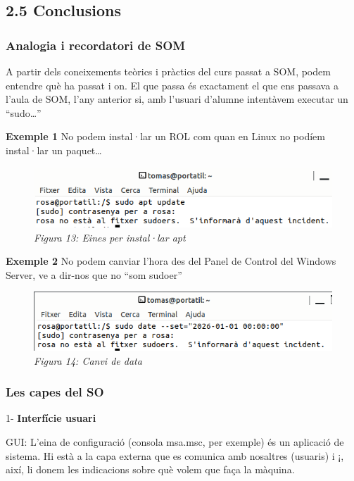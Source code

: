 \documentclass[
  a4paper,
]{article}
\begin{document}
\subsection{2.5 Conclusions}\label{conclusions}

\subsubsection{Analogia i recordatori de
SOM}\label{analogia-i-recordatori-de-som}

A partir dels coneixements teòrics i pràctics del curs passat a SOM,
podem entendre què ha passat i on. El que passa és exactament el que ens
passava a l'aula de SOM, l'any anterior si, amb l'usuari d'alumne
intentàvem executar un ``sudo\ldots{}''

\textbf{Exemple 1} No podem instal·lar un ROL com quan en Linux no
podíem instal·lar un paquet\ldots{}

\begin{figure}
\centering
\includegraphics{png/rosaUpdate.png}
\caption{\emph{Figura 13: Eines per instal·lar apt}}
\end{figure}

\textbf{Exemple 2} No podem canviar l'hora des del Panel de Control del
Windows Server, ve a dir-nos que no ``som sudoer''

\begin{figure}
\centering
\includegraphics{png/rosaHora.png}
\caption{\emph{Figura 14: Canvi de data}}
\end{figure}

\subsubsection{Les capes del SO}\label{les-capes-del-so}

1- \textbf{Interfície usuari}

GUI: L'eina de configuració (consola msa.msc, per exemple) és un
aplicació de sistema. Hi està a la capa externa que es comunica amb
nosaltres (usuaris) i ¡, així, li donem les indicacions sobre què volem
que faça la màquina.
\end{document}

